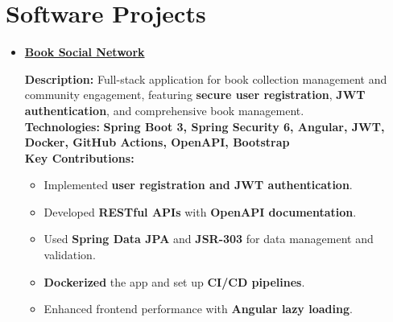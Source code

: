\documentclass[11pt,a4paper,sans]{moderncv}        %
\begin{document}

\section{Software Projects}
\vspace{1pt}
\begin{itemize}
    \item{\cventry
        {} 
        {\href{https://github.com/Rajmathur-8/Book-Buddies}{\textbf{Book Social Network}}}
        {} 
        {} 
        {}
        {
            \vspace{3pt}
            \textbf{Description:} Full-stack application for book collection management and community engagement, featuring \textbf{secure user registration}, \textbf{JWT authentication}, and comprehensive book management. \\
            \textbf{Technologies:} \textbf{Spring Boot 3, Spring Security 6, Angular, JWT, Docker, GitHub Actions, OpenAPI, Bootstrap} \\
            \textbf{Key Contributions:}
            \begin{itemize}
                \item Implemented \textbf{user registration and JWT authentication}.
                \item Developed \textbf{RESTful APIs} with \textbf{OpenAPI documentation}.
                \item Used \textbf{Spring Data JPA} and \textbf{JSR-303} for data management and validation.
                \item \textbf{Dockerized} the app and set up \textbf{CI/CD pipelines}.
                \item Enhanced frontend performance with \textbf{Angular lazy loading}.
            \end{itemize}
        }
    }


\end{itemize}
\end{document}
